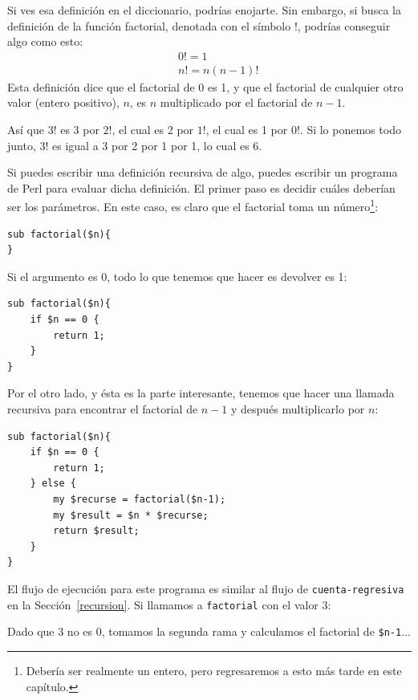 Si ves esa definición en el diccionario, podrías enojarte. 
Sin embargo, si busca la definición de la función factorial,
denotada con el símbolo $!$, podrías conseguir algo como esto:
%
\begin{eqnarray*}
&&  0! = 1 \\
&&  n! = n (n-1)!
\end{eqnarray*}
%
Esta definición dice que el factorial de 0 es 1, y que el factorial
de cualquier otro valor (entero positivo), $n$, es 
$n$ multiplicado por el factorial de $n-1$.

Así que $3!$ es 3 por $2!$, el cual es 2 por $1!$, el cual es 1 por
$0!$. Si lo ponemos todo junto, $3!$ es igual a 3 por 2 por 1 por 1, 
lo cual es 6.

Si puedes escribir una definición recursiva de algo, puedes escribir
un programa de Perl para evaluar dicha definición. El primer paso
es decidir cuáles deberían ser los parámetros. En este caso, es
claro que el factorial toma un número\footnote{Debería ser realmente un entero, pero regresaremos a esto más tarde en este capítulo.}:

\begin{lstlisting}
sub factorial($n){
}
\end{lstlisting}
%
Si el argumento es 0, todo lo que tenemos que hacer es devolver es 1:

\begin{lstlisting}
sub factorial($n){
    if $n == 0 {
        return 1;
    }
}   
\end{lstlisting}
%
Por el otro lado, y ésta es la parte interesante, tenemos que hacer
una llamada recursiva para encontrar el factorial de $n-1$ y después
multiplicarlo por $n$:

\begin{lstlisting}
sub factorial($n){
    if $n == 0 {
        return 1;
    } else {
        my $recurse = factorial($n-1);
        my $result = $n * $recurse;
        return $result;
    }
}
\end{lstlisting}
%
El flujo de ejecución para este programa es similar al flujo de 
{\tt cuenta-regresiva} en la Sección~\ref{recursion}. Si llamamos
a {\tt factorial} con el valor 3:

Dado que 3 no es 0, tomamos la segunda rama y calculamos el factorial de
{\tt \$n-1}...

